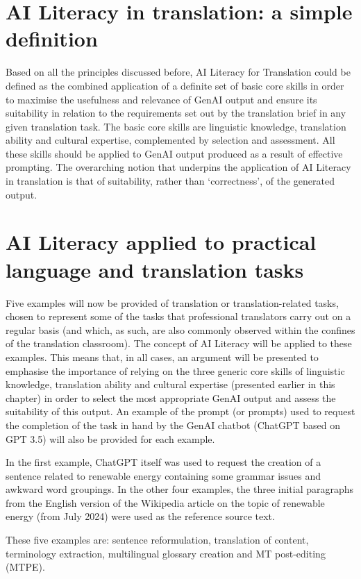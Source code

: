 \documentclass[output=paper]{langscibook}
\begin{document}
\section{AI Literacy in translation: a simple definition}
Based on all the principles discussed before, AI Literacy for Translation could be defined as the combined application of a definite set of basic core skills in order to maximise the usefulness and relevance of GenAI output and ensure its suitability in relation to the requirements set out by the translation brief in any given translation task. The basic core skills are linguistic knowledge, translation ability and cultural expertise, complemented by selection and assessment. All these skills should be applied to GenAI output produced as a result of effective prompting. The overarching notion that underpins the application of AI Literacy in translation is that of suitability, rather than ‘correctness’, of the generated output.

\section{AI Literacy applied to practical language and translation tasks}
Five examples will now be provided of translation or translation-related tasks, chosen to represent some of the tasks that professional translators carry out on a regular basis (and which, as such, are also commonly observed within the confines of the translation classroom). The concept of AI Literacy will be applied to these examples. This means that, in all cases, an argument will be presented to emphasise the importance of relying on the three generic core skills of linguistic knowledge, translation ability and cultural expertise (presented earlier in this chapter) in order to select the most appropriate GenAI output and assess the suitability of this output. An example of the prompt (or prompts) used to request the completion of the task in hand by the GenAI chatbot (ChatGPT based on GPT 3.5) will also be provided for each example. 

In the first example, ChatGPT itself was used to request the creation of a sentence related to renewable energy containing some grammar issues and awkward word groupings. In the other four examples, the three initial paragraphs from the English version of the Wikipedia article on the topic of renewable energy (from July 2024) were used as the reference source text.

These five examples are: sentence reformulation, translation of content, terminology extraction, multilingual glossary creation and MT post-editing (MTPE).
\end{document}
